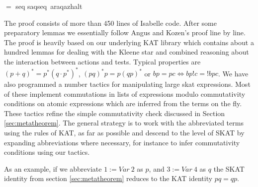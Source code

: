 \documentclass{llncs}
\begin{document}
\begin{isabellebody}
$=$\isanewline
seq {}s{}{}a{}{}q{}{}{}{}{}seq\ {}{}a{}{}r{}{}{}a{}{}q{}{}{}{}{}a{}{}z{}{}halt{}{}\isanewline
\end{isabellebody}

The proof consists of more than 450 lines of Isabelle code. After some
preparatory lemmas we essentially follow Angus and Kozen's proof line
by line. The proof is heavily based on our underlying KAT library
which contains about a hundred lemmas for dealing with the Kleene star
and combined reasoning about the interaction between actions and
tests. Typical properties are $(p+q)^\ast = p^\ast(q\cdot
p^\ast)^\ast$, $(pq)^\ast p = p(qp)^\ast$ or $bp = pc
\Longleftrightarrow bp!c = !bpc$. We have also programmed a number
tactics for manipulating large skat expressions. Most of these
implement commutations in lists of expressions modulo commutativity
conditions on atomic expressions which are inferred from the terms on
the fly. These tactics refine the simple commutativity check discussed
in Section \ref{sec:metatheorem}. The general strategy is to work with
the abbreviated terms using the rules of KAT, as far as possible and
descend to the level of SKAT by expanding abbreviations where
necessary, for instance to infer commutativity conditions using our
tactics.

As an example, if we abbreviate $1 := Var\ 2$ as $p$, and $3 := Var\ 4$
as $q$ the SKAT identity from section \ref{sec:metatheorem} reduces to
the KAT identity $pq = qp$.
\end{document}
